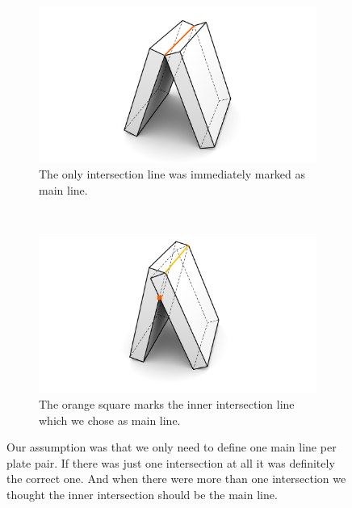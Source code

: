 \documentclass[../ClassicThesis.tex]{subfiles}
\begin{document}
\begin{figure}[!ht]
\centering
\begin{subfigure}[b]{0.45\textwidth}
\includegraphics[width=\columnwidth]{Images/1Touching.png}
\caption{The only intersection line was immediately marked as main line.}
\end{subfigure}
~
\begin{subfigure}[b]{0.45\textwidth}
\includegraphics[width=\columnwidth]{Images/2InsideOverlap.png}
\caption{The orange square marks the inner intersection line which we chose as main line.}
\end{subfigure}
\caption{Our assumption was that we only need to define one main line per plate pair. If there was just one intersection at all it was definitely the correct one. And when there were more than one intersection we thought the inner intersection should be the main line. }
\label{fig:assumption}
\end{figure}
\end{document}
